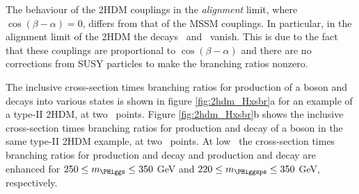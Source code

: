 The behaviour of the \ac{2HDM} couplings in the \textit{alignment} limit,
where $\cos{(\beta-\alpha)} = 0$, differs from that of the \ac{MSSM} couplings.
In particular, in the alignment limit of the \ac{2HDM} the decays \AtoZh~and \Htohh~vanish.
This is due to the fact that these couplings are
proportional to $\cos{(\beta-\alpha)}$ and there are no corrections
from \ac{SUSY} particles to make the branching ratios nonzero.

The inclusive cross-section times branching ratios for production of a \PHiggs boson 
and decays into various states is shown in figure \ref{fig:2hdm_Hxsbr}a for an 
example of a type-II \ac{2HDM}, at two \tanb~points. Figure \ref{fig:2hdm_Hxsbr}b 
shows the inclusive cross-section times branching ratios for production and decay
of a \PHiggsps boson in the same type-II \ac{2HDM} example, at two \tanb~points. At
low \tanb~the cross-section times branching ratios for \Htohh production and decay and \AtoZh production
and decay are enhanced for $250\leq m_{\PHiggs}\leq 350$ GeV and $220 \leq m_{\PHiggsps} \leq 350$ GeV, respectively.

